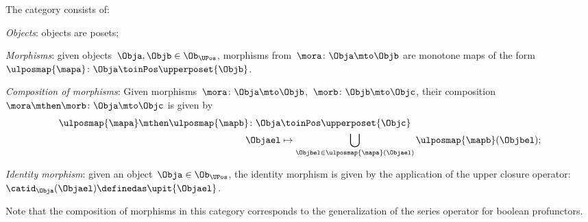 \begin{definition}
\label{def:upos_cat}
The category \UPos consists of:
\begin{compactenum}
    \item \emph{Objects}: objects are posets;
    \item \emph{Morphisms}: given objects~$\Obja,\Objb\in \Ob_{\UPos}$, morphisms from~$\mora\colon \Obja \mto \Objb$ are monotone maps of the form~$\ulposmap{\mapa} \colon \Obja \toinPos \upperposet{\Objb}$.
    \item \emph{Composition of morphisms}: Given morphisms~$\mora\colon \Obja \mto \Objb$,~$\morb\colon \Objb\mto \Objc$, their composition~$\mora\mthen \morb\colon \Obja\mto \Objc$ is given by
    \begin{equation}
    \begin{aligned}
        \ulposmap{\mapa} \mthen \ulposmap{\mapb} \colon \Obja&\toinPos \upperposet{\Objc}\\
        \Objael&\mapsto \bigcup_{\Objbel\in \ulposmap{\mapa}(\Objael)}\ulposmap{\mapb}(\Objbel);
    \end{aligned}
    \end{equation}
    \item \emph{Identity morphism}: given an object~$\Obja\in \Ob_{\UPos}$, the identity morphism is given by the application of the upper closure operator:~$\catid_\Obja(\Objael)\definedas \upit\{\Objael\}$.
\end{compactenum}
\end{definition}

\begin{remark}
Note that the composition of morphisms in this category corresponds to the generalization of the series operator for boolean profunctors.
\end{remark}

